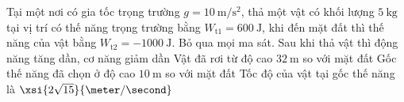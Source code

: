 \begin{ex}
	Tại một nơi có gia tốc trọng trường $g=\SI{10}{\meter/\second^2}$, thả một vật có khối lượng $\SI{5}{\kilogram}$ tại vị trí có thế năng trọng trường bằng $W_{\text{t1}}=\SI{600}{\joule}$, khi đến mặt đất thì thế năng của vật bằng $W_{\text{t2}}=\SI{-1000}{\joule}$. Bỏ qua mọi ma sát.
	\choiceTF
	{Sau khi thả vật thì động năng tăng dần, cơ năng giảm dần}
	{\True Vật đã rơi từ độ cao $\SI{32}{\meter}$ so với mặt đất} 
	{Gốc thế năng đã chọn ở độ cao $\SI{10}{\meter}$ so với mặt đất}
	{Tốc độ của vật tại gốc thế năng là $\xsi{2\sqrt{15}}{\meter/\second}$}
\end{ex}

